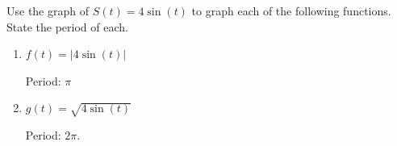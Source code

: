 \documentclass{ximera}
\begin{document}
\begin{problem} Use the graph of  $S(t) = 4 \sin(t)$ to graph each of the following functions. State the period of each.

\begin{enumerate}

\item $f(t) = | 4 \sin(t)|$

\begin{solution}
Period: $\pi$
\begin{center} 
\end{center}
\end{solution}

\item $g(t) = \sqrt{4\sin(t)}$

\begin{solution}
Period: $2\pi$.
\begin{center} 
\end{center}
\end{solution}

\end{enumerate}

\end{problem}
\end{document}
